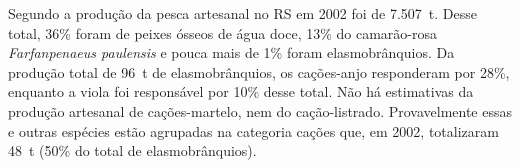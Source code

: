 \documentclass[a4paper,11pt,twoside,showtrims,onecolumn,openright,final]{memoir}
\begin{document}

Segundo \citet{ceperg2003} a produção da pesca artesanal no RS em 2002
foi de 7.507~t. Desse total, 36\%  foram de peixes ósseos de água doce, 
13\% do camarão-rosa \emph{Farfanpenaeus paulensis} e pouca mais de 1\% foram elasmobrânquios. 
Da produção total de 96~t de elasmobrânquios, os cações-anjo responderam por 28\%, enquanto 
a viola foi responsável por 10\% desse total. Não há estimativas da produção artesanal de
cações-martelo, nem do cação-listrado. Provavelmente essas e outras espécies estão agrupadas
na categoria cações que, em 2002, totalizaram 48~t (50\% do total de elasmobrânquios).


\end{document}
